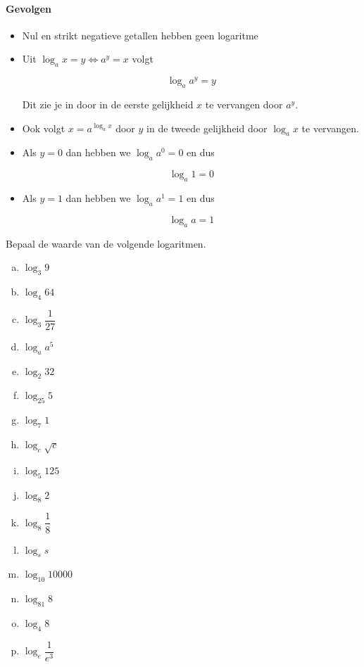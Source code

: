 \documentclass[12pt,twoside]{article}
\begin{document}
\paragraph{Gevolgen}
\begin{itemize}
  \item Nul en strikt negatieve getallen hebben geen logaritme
  \item Uit $\log_a x = y \Leftrightarrow a^y=x$ volgt
  \begin{mdframed}
  $$\log_a a^y=y$$
  \end{mdframed}
  Dit zie je in door in de eerste gelijkheid $x$ te vervangen door $a^y$.
  \item Ook volgt $x=a^{\log_a x}$ door $y$ in de tweede gelijkheid door $\log_a x$ te vervangen.
  \item Als $y=0$ dan hebben we $\log_a a^0=0$ en dus
  \begin{mdframed}
  $$\log_a 1=0$$
  \end{mdframed}
  \item Als $y=1$ dan hebben we $\log_a a^1=1$ en dus
  \begin{mdframed}
  $$\log_a a=1$$
  \end{mdframed}
\end{itemize}

\begin{oefening} %
Bepaal de waarde van de volgende logaritmen.
\begin{multicols}{4}
\begin{enumerate}[(a)]
  \item $\log_3 9$
  \item $\log_4 64$
  \item $\log_3 \dfrac{1}{27}$
  \item $\log_a a^5$
  \item $\log_2 32$
  \item $\log_25 5$
  \item $\log_7 1$
  \item $\log_c \sqrt{c}$
  \item $\log_5 125$
  \item $\log_8 2$
  \item $\log_8 \dfrac{1}{8}$
  \item $\log_s s$
  \item $\log_{10} 10000$
  \item $\log_{81} 8$
  \item $\log_4 8$
  \item $\log_e \dfrac{1}{e^3}$
\end{enumerate}
\end{multicols}
\end{oefening}
\end{document}
